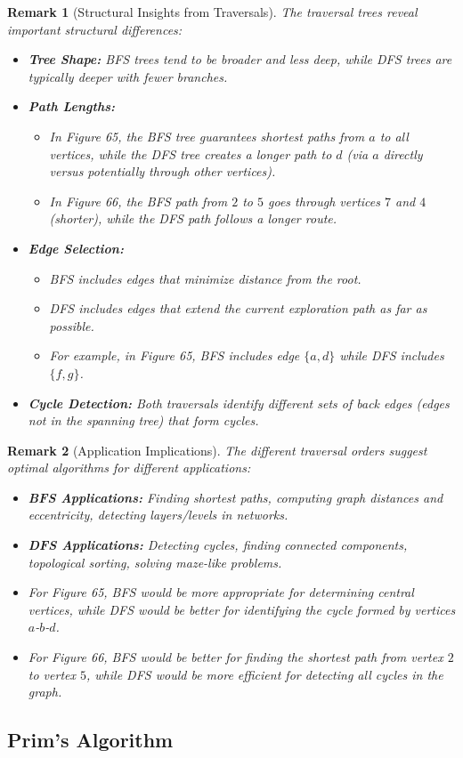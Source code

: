 \documentclass{article}
\newtheorem{remark}{Remark}
\theoremstyle{definition}
\begin{document}
\begin{remark}[Structural Insights from Traversals]
The traversal trees reveal important structural differences:
\begin{itemize}
\item \textbf{Tree Shape:} BFS trees tend to be broader and less deep, while DFS trees are typically deeper with fewer branches.

\item \textbf{Path Lengths:} 
  \begin{itemize}
  \item In Figure 65, the BFS tree guarantees shortest paths from $a$ to all vertices, while the DFS tree creates a longer path to $d$ (via $a$ directly versus potentially through other vertices).
  \item In Figure 66, the BFS path from $2$ to $5$ goes through vertices $7$ and $4$ (shorter), while the DFS path follows a longer route.
  \end{itemize}
  
\item \textbf{Edge Selection:}
  \begin{itemize}
  \item BFS includes edges that minimize distance from the root.
  \item DFS includes edges that extend the current exploration path as far as possible.
  \item For example, in Figure 65, BFS includes edge $\{a,d\}$ while DFS includes $\{f,g\}$.
  \end{itemize}
  
\item \textbf{Cycle Detection:} Both traversals identify different sets of back edges (edges not in the spanning tree) that form cycles.
\end{itemize}
\end{remark}

\begin{remark}[Application Implications]
The different traversal orders suggest optimal algorithms for different applications:
\begin{itemize}
\item \textbf{BFS Applications:} Finding shortest paths, computing graph distances and eccentricity, detecting layers/levels in networks.

\item \textbf{DFS Applications:} Detecting cycles, finding connected components, topological sorting, solving maze-like problems.

\item For Figure 65, BFS would be more appropriate for determining central vertices, while DFS would be better for identifying the cycle formed by vertices $a$-$b$-$d$.

\item For Figure 66, BFS would be better for finding the shortest path from vertex $2$ to vertex $5$, while DFS would be more efficient for detecting all cycles in the graph.
\end{itemize}
\end{remark}

\pagebreak
\subsection{Prim's Algorithm}
\end{document}
